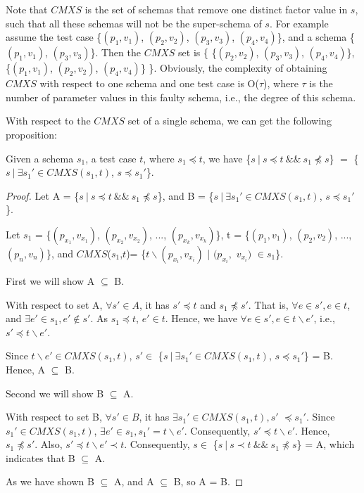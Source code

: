 Note that $CMXS$ is the set of schemas that remove one distinct factor value in $s$, such that all these schemas will not be the super-schema of $s$. For example assume the test case \{$(p_{1}, v_{1})$, $(p_{2}, v_{2})$, $(p_{3}, v_{3})$, $(p_{4}, v_{4})$\}, and a schema \{$(p_{1}, v_{1})$, $(p_{3}, v_{3})$\}. Then the $CMXS$ set is \{ \{$(p_{2}, v_{2})$,  $(p_{3}, v_{3})$, $(p_{4}, v_{4})$\}, \{$(p_{1}, v_{1})$,  $(p_{2}, v_{2})$, $(p_{4}, v_{4})$\} \}. Obviously, the complexity of obtaining $CMXS$ with respect to one schema and one test case is O($\tau$), where $\tau$ is the number of parameter values in this faulty schema, i.e., the degree of this schema.

With respect to the $CMXS$ set of a single schema, we can get the following proposition:


\begin{proposition}\label{pro:subofCMXS}
Given a schema $s_{1}$, a test case $t$, where $s_{1} \preceq t$, we have \{$s\ |\ s \preceq t\ \&\&\ s_{1} \npreceq s$\} $=$  \{$ s\ |\ \exists s_{1}' \in CMXS(s_{1}, t)$, $s \preceq s_{1}'$\}.
\end{proposition}

\begin{proof}

Let A =  \{$s\ |\ s \preceq t\ \&\&\ s_{1} \npreceq s$\}, and B = \{$ s\ |\ \exists s_{1}' \in CMXS(s_{1}, t)$, $s \preceq s_{1}'$\}.



Let $s_{1}$ = \{$(p_{x_{1}}, v_{x_{1}})$, $(p_{x_{2}}, v_{x_{2}})$, ..., $(p_{x_{k}}, v_{x_{k}})$\},  t = \{$(p_{1}, v_{1})$, $(p_{2}, v_{2})$, ..., $(p_{n}, v_{n})$\}, and $CMXS$($s_{1}$,$t$)= \{$t \backslash (p_{x_{i}}, v_{x_{i}})$ | $(p_{x_{i}},$ $v_{x_{i}})$ $ \in s_{1} $\}.

First we will show A $\subseteq$ B.

With respect to set A, $\forall s' \in A$, it has $s' \preceq t$ and $ s_{1} \npreceq s'$. That is, $\forall e \in s', e \in t$, and  $\exists e' \in s_{1}, e' \not\in s'$. As $s_{1} \preceq t$, $e' \in t$. Hence, we have $\forall e \in s', e \in t \backslash e'$, i.e., $s' \preceq t \backslash e'$.

Since $t \backslash e' \in CMXS(s_{1}, t)$,  $s' \in $ \{$ s\ |\ \exists s_{1}' \in CMXS(s_{1}, t)$, $s \preceq s_{1}'$\} = B. Hence, A $\subseteq$ B.

Second we will show B $\subseteq$ A.

With respect to set B, $\forall s' \in B$, it has $\exists s_{1}' \in CMXS(s_{1}, t), s'$ $ \preceq s_{1}'$. Since $s_{1}' \in CMXS(s_{1}, t)$, $\exists e' \in s_{1}, s_{1}' =  t \backslash e'$. Consequently, $s' \preceq t \backslash e'$. Hence, $s_{1} \npreceq s'$. Also, $s' \preceq t \backslash e' \prec t$. Consequently, $s \in $  \{$s\ |\ s \prec t\ \&\&\ s_{1} \npreceq s$\} = A, which indicates that B $\subseteq$ A.

As we have shown B $\subseteq$ A, and A $\subseteq$ B, so A = B.

\end{proof}


